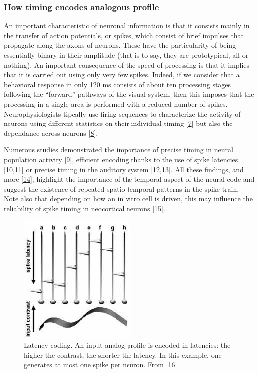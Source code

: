 \hypertarget{how-timing-encodes-analogous-profile}{%
\subsubsection{How timing encodes analogous profile}\label{how-timing-encodes-analogous-profile}}

An important characteristic of neuronal information is that it consists mainly in the transfer of action potentials, or spikes, which consist of brief impulses that propagate along the axons of neurons. These have the particularity of being essentially binary in their amplitude (that is to say, they are prototypical, all or nothing). An important consequence of the speed of processing is that it implies that it is carried out using only very few spikes. Indeed, if we consider that a behavioral response in only 120 ms consists of about ten processing stages following the ``forward'' pathways of the visual system, then this imposes that the processing in a single area is performed with a reduced number of spikes. Neurophysiologists tipcally use firing sequences to characterize the activity of neurons using different statistics on their individual timing {[}\protect\hyperlink{ref-zZUVkTfZ}{7}{]} but also the dependance across neurons {[}\protect\hyperlink{ref-13T2Gne9z}{8}{]}.

Numerous studies demonstrated the importance of precise timing in neural population activity {[}\protect\hyperlink{ref-BNK6T5Uk}{9}{]}, efficient encoding thanks to the use of spike latencies {[}\protect\hyperlink{ref-1DpSM1kpQ}{10},\protect\hyperlink{ref-IjepoonT}{11}{]} or precise timing in the auditory system {[}\protect\hyperlink{ref-mxPMgOmW}{12},\protect\hyperlink{ref-1ECJhg2GM}{13}{]}. All these findings, and more {[}\protect\hyperlink{ref-WZsEyOlK}{14}{]}, highlight the importance of the temporal aspect of the neural code and suggest the existence of repeated spatio-temporal patterns in the spike train. Note also that depending on how an in vitro cell is driven, this may influence the reliability of spike timing in neocortical neurons {[}\protect\hyperlink{ref-XsHCA4IZ}{15}{]}.

\begin{figure}
\hypertarget{fig:roc}{%
\centering
\includegraphics{images/roc.jpg}
\caption{Latency coding. An input analog profile is encoded in latencies: the higher the contrast, the shorter the latency. In this example, one generates at most one spike per neuron. From {[}\protect\hyperlink{ref-YX5wqWH4}{16}{]}}\label{fig:roc}
}
\end{figure}

